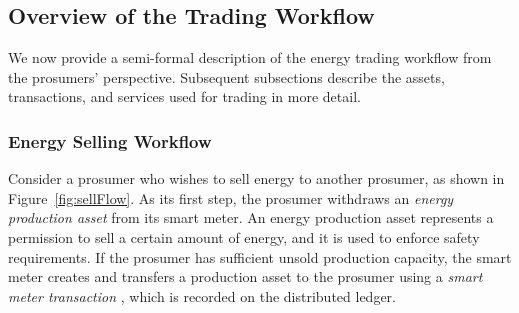 \begin{figure*}[h]
\caption{Simplified overview of the flow of assets from the perspective of a prosumer who sells energy.
Note that to prevent de-anonymization, a prosumer should use multiple addresses and multiple rounds of mixing, which we have omitted from the figure for clarity of presentation.}
\label{fig:sellFlow}
\end{figure*}

\subsection{Overview of the Trading Workflow}
We now provide a semi-formal description of the energy trading
workflow from the prosumers' perspective.  Subsequent subsections
describe the assets, transactions, and services used for trading in
more detail.

\subsubsection{Energy Selling Workflow}
Consider a prosumer who wishes to sell energy to another prosumer, as
shown in Figure~\ref{fig:sellFlow}.    As
its first step, the prosumer withdraws an \emph{energy production
  asset} from its smart meter.  An energy production asset represents
a permission to sell a certain amount of energy, and it is used to
enforce safety requirements.  If the prosumer has sufficient unsold
production capacity, the smart meter creates and transfers a
production asset to the prosumer using a \emph{smart meter
  transaction} , which is recorded on the distributed
ledger.

